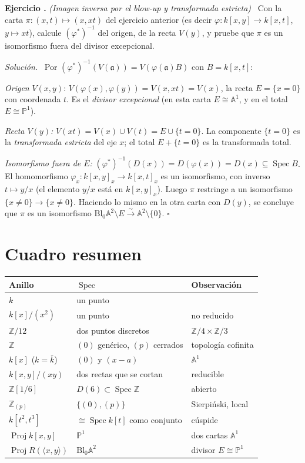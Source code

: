 \documentclass[11pt,a4paper]{article}
\newcommand{\Spec}{\operatorname{Spec}}
\newcommand{\Proj}{\operatorname{Proj}}
\newcommand{\ZZ}{\mathbb{Z}}
\newcommand{\A}{\mathbb{A}}
\newcommand{\PP}{\mathbb{P}}
\newcommand{\gen}[1]{\langle #1\rangle}
\newcounter{ej}
\newenvironment{ejercicio}[1]{\refstepcounter{ej}\par\bigskip\noindent\textbf{Ejercicio \theej.} \emph{(#1)}\ }{\par}
\newenvironment{solucion}{\par\smallskip\noindent\textit{Solución.}\ }{\hfill$\square$\par}
\begin{document}
\begin{ejercicio}{Imagen inversa por el blow-up y transformada estricta}
Con la carta $\pi:(x,t)\mapsto(x,xt)$ del ejercicio anterior (es decir $\varphi:k[x,y]\to k[x,t]$, $y\mapsto xt$), calcule $(\varphi^*)^{-1}$ del origen, de la recta $V(y)$, y pruebe que $\pi$ es un isomorfismo fuera del divisor excepcional.
\end{ejercicio}
\begin{solucion}
Por $(\varphi^*)^{-1}(V(\mathfrak a))=V(\varphi(\mathfrak a)B)$ con $B=k[x,t]$:

\emph{Origen} $V(x,y)$: $V(\varphi(x),\varphi(y))=V(x,xt)=V(x)$, la recta $E=\{x=0\}$ con coordenada $t$. Es el \emph{divisor excepcional} (en esta carta $E\cong\A^1$, y en el total $E\cong\PP^1$).

\emph{Recta $V(y)$:} $V(xt)=V(x)\cup V(t)=E\cup\{t=0\}$. La componente $\{t=0\}$ es la \emph{transformada estricta} del eje $x$; el total $E+\{t=0\}$ es la transformada total.

\emph{Isomorfismo fuera de $E$:} $(\varphi^*)^{-1}(D(x))=D(\varphi(x))=D(x)\subseteq\Spec B$. El homomorfismo $\varphi_x:k[x,y]_x\to k[x,t]_x$ es un isomorfismo, con inverso $t\mapsto y/x$ (el elemento $y/x$ está en $k[x,y]_x$). Luego $\pi$ restringe a un isomorfismo $\{x\ne0\}\to\{x\ne0\}$. Haciendo lo mismo en la otra carta con $D(y)$, se concluye que $\pi$ es un isomorfismo $\mathrm{Bl}_0\A^2\setminus E\xrightarrow{\ \sim\ }\A^2\setminus\{0\}$.
\end{solucion}

\section*{Cuadro resumen}

\begin{center}
\small
\begin{tabular}{@{}lll@{}}
\toprule
Anillo & $\Spec$ & Observación \\
\midrule
$k$ & un punto & \\
$k[x]/(x^2)$ & un punto & no reducido \\
$\ZZ/12$ & dos puntos discretos & $\ZZ/4\times\ZZ/3$ \\
$\ZZ$ & $(0)$ genérico, $(p)$ cerrados & topología cofinita \\
$k[x]$ ($k=\bar k$) & $(0)$ y $(x-a)$ & $\A^1$ \\
$k[x,y]/(xy)$ & dos rectas que se cortan & reducible \\
$\ZZ[1/6]$ & $D(6)\subset\Spec\ZZ$ & abierto \\
$\ZZ_{(p)}$ & $\{(0),(p)\}$ & Sierpiński, local \\
$k[t^2,t^3]$ & $\cong\Spec k[t]$ como conjunto & cúspide \\
$\Proj k[x,y]$ & $\PP^1$ & dos cartas $\A^1$ \\
$\Proj R(\gen{x,y})$ & $\mathrm{Bl}_0\A^2$ & divisor $E\cong\PP^1$ \\
\bottomrule
\end{tabular}
\end{center}
\end{document}
